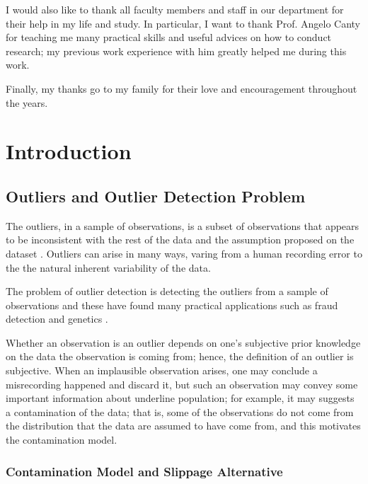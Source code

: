 \documentclass{report}
\begin{document}
I would also like to thank all  faculty members and staff in our department for their help in my life and study. In particular,
I want to thank Prof. Angelo Canty for teaching me many practical skills and useful advices on how to conduct research;
my previous work experience with him greatly helped me during this work.

Finally, my thanks go to my family for their love and encouragement throughout the years.



\tableofcontents

\chapter{Introduction} \label{chapter 1}

\section{Outliers and Outlier Detection Problem}

The outliers, in a sample of observations, is a subset of observations that appears to be inconsistent with the rest of the data and the assumption proposed
on the dataset \cite{grubbs1969procedures}. Outliers can arise in many ways, varing from a human recording error to the the natural inherent variability of
the data.

The problem of outlier detection is detecting  the outliers from a sample of observations and these have found many
 practical applications such as fraud detection \cite{ferdousi2006unsupervised} and
genetics \cite{norton2018outlier}. 

Whether an observation is an outlier depends on one’s subjective prior knowledge on the data
the observation is coming from; hence, the definition of an outlier is subjective. When an implausible observation arises, one may conclude a
misrecording happened and discard it, but such an observation may convey some important information about underline population; for example, it may
suggests a contamination of the data; that is, some of the observations do not come from the distribution that the data are assumed to have come from,
and this motivates the contamination model.


\subsection{Contamination Model and Slippage Alternative}
\end{document}

